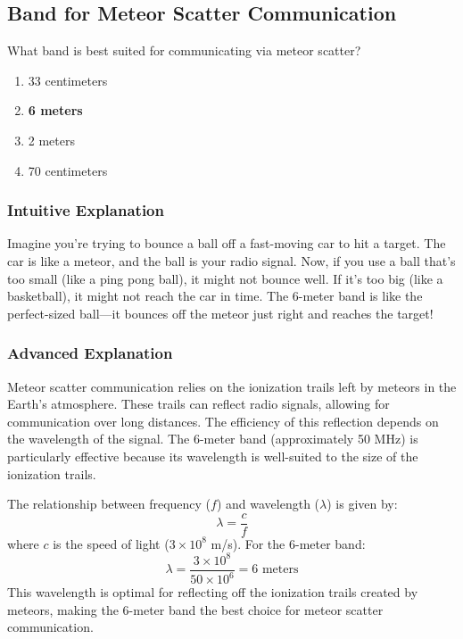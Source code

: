 \subsection{Band for Meteor Scatter Communication}
\label{T3C07}

\begin{tcolorbox}[colback=gray!10!white,colframe=black!75!black,title=T3C07]
What band is best suited for communicating via meteor scatter?
\begin{enumerate}[label=\Alph*)]
    \item 33 centimeters
    \item \textbf{6 meters}
    \item 2 meters
    \item 70 centimeters
\end{enumerate}
\end{tcolorbox}

\subsubsection{Intuitive Explanation}
Imagine you're trying to bounce a ball off a fast-moving car to hit a target. The car is like a meteor, and the ball is your radio signal. Now, if you use a ball that's too small (like a ping pong ball), it might not bounce well. If it's too big (like a basketball), it might not reach the car in time. The 6-meter band is like the perfect-sized ball—it bounces off the meteor just right and reaches the target!

\subsubsection{Advanced Explanation}
Meteor scatter communication relies on the ionization trails left by meteors in the Earth's atmosphere. These trails can reflect radio signals, allowing for communication over long distances. The efficiency of this reflection depends on the wavelength of the signal. The 6-meter band (approximately 50 MHz) is particularly effective because its wavelength is well-suited to the size of the ionization trails. 

The relationship between frequency (\(f\)) and wavelength (\(\lambda\)) is given by:
\[
\lambda = \frac{c}{f}
\]
where \(c\) is the speed of light (\(3 \times 10^8\) m/s). For the 6-meter band:
\[
\lambda = \frac{3 \times 10^8}{50 \times 10^6} = 6 \text{ meters}
\]
This wavelength is optimal for reflecting off the ionization trails created by meteors, making the 6-meter band the best choice for meteor scatter communication.

